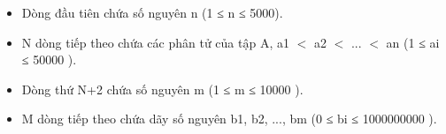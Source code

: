 \begin{itemize}
	\item     Dòng đầu tiên chứa số nguyên n (1 ≤ n ≤ 5000).   
	\item     N dòng tiếp theo chứa các phân tử của tập A, a1 $<$ a2 $<$ ... $<$ an  (1  ≤ ai  ≤ 50000 ).   
	\item     Dòng thứ N+2 chứa số nguyên m (1 ≤ m ≤ 10000 ).   
	\item     M dòng tiếp theo chứa dãy số nguyên b1, b2, ..., bm (0 ≤ bi ≤ 1000000000 ).   
\end{itemize}